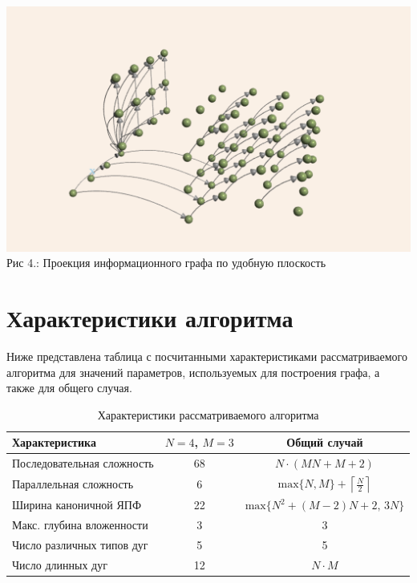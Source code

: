     \begin{center}
        \includegraphics[width=0.9\linewidth]{graph.png}
        \newline
        Рис 4.: Проекция информационного графа по удобную плоскость
    \end{center}
    \clearpage

    \section{Характеристики алгоритма}
    Ниже представлена таблица с посчитанными характеристиками рассматриваемого алгоритма для значений параметров, используемых для построения графа, а также для общего случая.
    \begin{table}[h]
        \centering
        \begin{tabular}[c]{|l|c|c|}
            \hline
            Характеристика & $N=4$, $M=3$ & Общий случай \\
            \hline\hline
            Последовательная сложность & 68 & $N\cdot(MN + M +2)$ \\
            \hline
            Параллельная сложность & 6 & $\mathrm{max}\{N, M\} + \left\lceil \frac{N}{2} \right\rceil$ \\
            \hline
            Ширина каноничной ЯПФ & 22 & $\mathrm{max}\{N^2 + (M-2)N + 2,\, 3N\}$ \\
            \hline
            Макс. глубина вложенности & 3 & 3 \\
            \hline
            Число различных типов дуг & 5  & 5 \\
            \hline
            Число длинных дуг & 12 & $N \cdot M$ \\
            \hline
        \end{tabular}
        \caption{Характеристики рассматриваемого алгоритма}
    \end{table}

